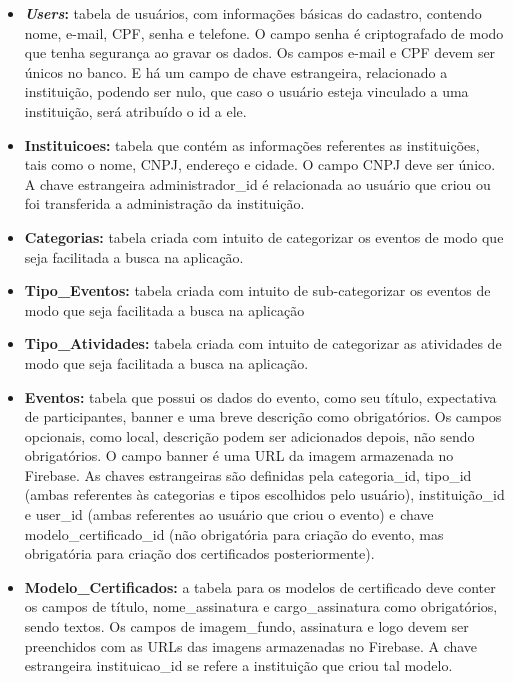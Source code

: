 \begin{itemize}
    \item \textbf{\textit{Users}:} tabela de usuários, com informações básicas do cadastro, contendo nome, e-mail, CPF, senha e telefone. O campo senha é criptografado de modo que tenha segurança ao gravar os dados. Os campos e-mail e CPF devem ser únicos no banco. E há um campo de chave estrangeira, relacionado a instituição, podendo ser nulo, que caso o usuário esteja vinculado a uma instituição, será atribuído o id a ele.
    
    \item \textbf{Instituicoes:} tabela que contém as informações referentes as instituições, tais como o nome, CNPJ, endereço e cidade. O campo CNPJ deve ser único. A chave estrangeira administrador\_id é relacionada ao usuário que criou ou foi transferida a administração da instituição.
    
    \item \textbf{Categorias:} tabela criada com intuito de categorizar os eventos de modo que seja facilitada a busca na aplicação.
    
    \item \textbf{Tipo\_Eventos:} tabela criada com intuito de sub-categorizar os eventos de modo que seja facilitada a busca na aplicação
    
    \item \textbf{Tipo\_Atividades:} tabela criada com intuito de categorizar as atividades de modo que seja facilitada a busca na aplicação.
    
    \item \textbf{Eventos:} tabela que possui os dados do evento, como seu título, expectativa de participantes, banner e uma breve descrição como obrigatórios. Os campos opcionais, como local, descrição podem ser adicionados depois, não sendo obrigatórios. O campo banner é uma URL da imagem armazenada no Firebase. As chaves estrangeiras são definidas pela categoria\_id, tipo\_id (ambas referentes às categorias e tipos escolhidos pelo usuário), instituição\_id e user\_id (ambas referentes ao usuário que criou o evento) e chave modelo\_certificado\_id (não obrigatória para criação do evento, mas obrigatória para criação dos certificados posteriormente).
    
    \item \textbf{Modelo\_Certificados:} a tabela para os modelos de certificado deve conter os campos de título, nome\_assinatura e cargo\_assinatura como obrigatórios, sendo textos. Os campos de imagem\_fundo, assinatura e logo devem ser preenchidos com as URLs das imagens armazenadas no Firebase. A chave estrangeira instituicao\_id se refere a instituição que criou tal modelo.
    

\end{itemize}
